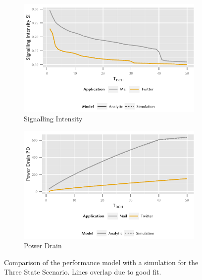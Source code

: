 \begin{figure}
	\begin{subfigure}[b]{\textwidth}
	\centering
	\includegraphics{network/performance_model/numerical_examples/figures/3state_tdch_si_analytic_simulative}
	\caption{Signalling Intensity}\label{fig:network:performance_model:numerical_examples:validations:analytic_vs_simulation:signalling_intensity}
	\end{subfigure}

	\begin{subfigure}[b]{\textwidth}
	\centering
	\includegraphics{network/performance_model/numerical_examples/figures/3state_tdch_pd_analytic_simulative}
	\caption{Power Drain}\label{fig:network:performance_model:numerical_examples:validations:analytic_vs_simulation:power_drain}
	\end{subfigure}

	\caption{Comparison of the performance model with a  simulation for the Three State Scenario. Lines overlap due to good fit.}\label{fig:network:performance_model:numerical_examples:validations:analytic_vs_simulation}
\end{figure}

